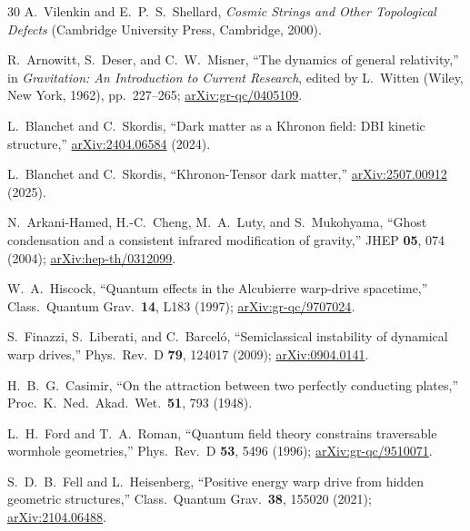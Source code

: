 \documentclass[prd,twocolumn,superscriptaddress,longbibliography]{revtex4-2}
\begin{document}
\begin{thebibliography}{30}
A.~Vilenkin and E.~P.~S.~Shellard,
\emph{Cosmic Strings and Other Topological Defects}
(Cambridge University Press, Cambridge, 2000).

R.~Arnowitt, S.~Deser, and C.~W.~Misner,
``The dynamics of general relativity,''
in \emph{Gravitation: An Introduction to Current Research},
edited by L.~Witten (Wiley, New York, 1962), pp.~227--265;
\href{https://arxiv.org/abs/gr-qc/0405109}{arXiv:gr-qc/0405109}.

L.~Blanchet and C.~Skordis,
``Dark matter as a Khronon field: DBI kinetic structure,''
\href{https://arxiv.org/abs/2404.06584}{arXiv:2404.06584} (2024).

L.~Blanchet and C.~Skordis,
``Khronon-Tensor dark matter,''
\href{https://arxiv.org/abs/2507.00912}{arXiv:2507.00912} (2025).

N.~Arkani-Hamed, H.-C.~Cheng, M.~A.~Luty, and S.~Mukohyama,
``Ghost condensation and a consistent infrared modification of gravity,''
JHEP \textbf{05}, 074 (2004);
\href{https://arxiv.org/abs/hep-th/0312099}{arXiv:hep-th/0312099}.

W.~A.~Hiscock,
``Quantum effects in the Alcubierre warp-drive spacetime,''
Class.\ Quantum Grav.\ \textbf{14}, L183 (1997);
\href{https://arxiv.org/abs/gr-qc/9707024}{arXiv:gr-qc/9707024}.

S.~Finazzi, S.~Liberati, and C.~Barcel\'{o},
``Semiclassical instability of dynamical warp drives,''
Phys.\ Rev.\ D \textbf{79}, 124017 (2009);
\href{https://arxiv.org/abs/0904.0141}{arXiv:0904.0141}.

H.~B.~G.~Casimir,
``On the attraction between two perfectly conducting plates,''
Proc.\ K.\ Ned.\ Akad.\ Wet.\ \textbf{51}, 793 (1948).

L.~H.~Ford and T.~A.~Roman,
``Quantum field theory constrains traversable wormhole geometries,''
Phys.\ Rev.\ D \textbf{53}, 5496 (1996);
\href{https://arxiv.org/abs/gr-qc/9510071}{arXiv:gr-qc/9510071}.

S.~D.~B.~Fell and L.~Heisenberg,
``Positive energy warp drive from hidden geometric structures,''
Class.\ Quantum Grav.\ \textbf{38}, 155020 (2021);
\href{https://arxiv.org/abs/2104.06488}{arXiv:2104.06488}.

\end{thebibliography}
\end{document}
